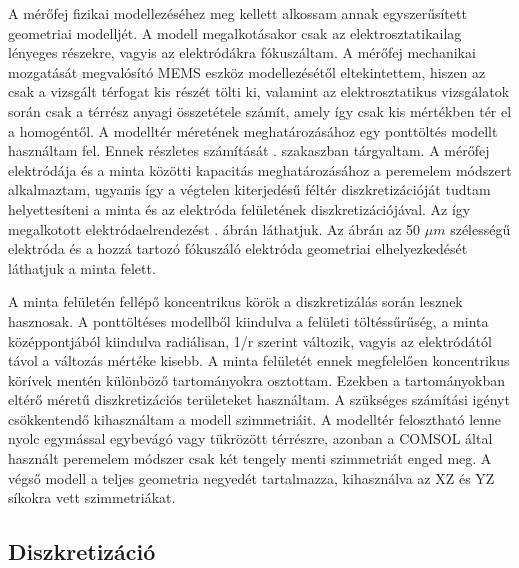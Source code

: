 A mérőfej fizikai modellezéséhez meg kellett alkossam annak egyszerűsített geometriai modelljét. A modell megalkotásakor csak az elektrosztatikailag lényeges részekre, vagyis az elektródákra fókuszáltam. A mérőfej mechanikai mozgatását megvalósító MEMS eszköz modellezésétől eltekintettem, hiszen az csak a vizsgált térfogat kis részét tölti ki, valamint az elektrosztatikus vizsgálatok során csak a térrész anyagi összetétele számít, amely így csak kis mértékben tér el a homogéntől. A modelltér méretének meghatározásához egy ponttöltés modellt használtam fel. Ennek részletes számítását . szakaszban tárgyaltam. A mérőfej elektródája és a minta közötti kapacitás meghatározásához a peremelem módszert alkalmaztam, ugyanis így a végtelen kiterjedésű féltér diszkretizációját tudtam helyettesíteni a minta és az elektróda felületének diszkretizációjával. Az így megalkotott elektródaelrendezést  . ábrán láthatjuk. Az ábrán az 50 $\mu m$ szélességű elektróda és a hozzá tartozó fókuszáló elektróda geometriai elhelyezkedését láthatjuk a minta felett.


A minta felületén fellépő koncentrikus körök a diszkretizálás során lesznek hasznosak. A ponttöltéses modellből kiindulva a felületi töltéssűrűség, a minta középpontjából kiindulva radiálisan, 1/r szerint változik, vagyis az elektródától távol a változás mértéke kisebb. A minta felületét ennek megfelelően koncentrikus körívek mentén különböző tartományokra osztottam. Ezekben a tartományokban eltérő méretű diszkretizációs területeket használtam. A szükséges számítási igényt csökkentendő kihasználtam a modell szimmetriáit. A modelltér felosztható lenne nyolc egymással egybevágó vagy tükrözött térrészre, azonban a COMSOL által használt peremelem módszer csak két tengely menti szimmetriát enged meg. A végső modell a teljes geometria negyedét tartalmazza, kihasználva az XZ és YZ síkokra vett szimmetriákat.

\subsection{Diszkretizáció}


